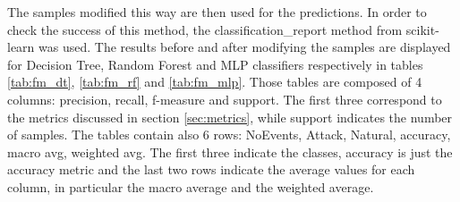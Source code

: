 The samples modified this way are then used for the predictions. In order to check the success of this method, the classification\_report method from scikit-learn was used. The results before and after modifying the samples are displayed for Decision Tree, Random Forest and MLP classifiers respectively in tables \ref{tab:fm_dt}, \ref{tab:fm_rf} and \ref{tab:fm_mlp}. Those tables are composed of 4 columns: precision, recall, f-measure and support. The first three correspond to the metrics discussed in section \ref{sec:metrics}, while support indicates the number of samples. The tables contain also 6 rows: NoEvents, Attack, Natural, accuracy, macro avg, weighted avg. The first three indicate the classes, accuracy is just the accuracy metric and the last two rows indicate the average values for each column, in particular the macro average and the weighted average.

